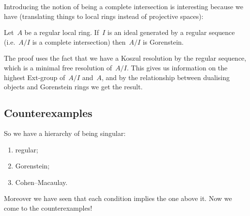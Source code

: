 \documentclass[10pt,a4paper]{article}
\begin{document}
Introducing the notion of being a complete intersection is interesting because we have \cite[corollary 21.19]{eisenbud-commutative-algebra} (translating things to local rings instead of projective spaces):
\begin{theorem}
  \label{theorem:complete-intersections-are-Gorenstein}
  Let~$A$ be a regular local ring. If~$I$ is an ideal generated by a regular sequence (i.e.\ $A/I$ is a complete intersection) then~$A/I$ is Gorenstein.
\end{theorem}
The proof uses the fact that we have a Koszul resolution by the regular sequence, which is a minimal free resolution of~$A/I$. This gives us information on the highest Ext-group of~$A/I$ and~$A$, and by the relationship between dualising objects and Gorenstein rings \cite[theorem 21.15]{eisenbud-commutative-algebra} we get the result.

\subsection{Counterexamples}
\label{subsection:counterexamples}
So we have a hierarchy of being singular:
\begin{enumerate}
  \item regular;
  \item Gorenstein;
  \item Cohen--Macaulay.
\end{enumerate}
Moreover we have seen that each condition implies the one above it. Now we come to the counterexamples!
\end{document}
